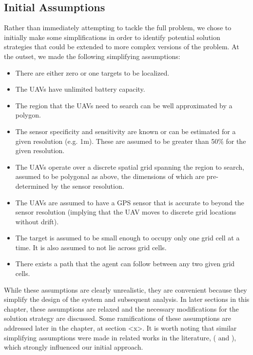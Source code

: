 \subsection{Initial Assumptions}\label{subsec:initalAssumptions}

Rather than immediately attempting to tackle the full problem, we chose to initially make some simplifications in order to identify potential solution strategies that could be extended to more complex versions of the problem. At the outset, we made the following simplifying assumptions:
\begin{itemize}
    \item There are either zero or one targets to be localized.
    \item The UAVs have unlimited battery capacity.
    \item The region that the UAVs need to search can be well approximated by a polygon.
    \item The sensor specificity and sensitivity are known or can be estimated for a given resolution (e.g. 1m). These are assumed to be greater than 50\% for the given resolution.
    \item The UAVs operate over a discrete spatial grid spanning the region to search, assumed to be polygonal as above, the dimensions of which are pre-determined by the sensor resolution.
    \item The UAVs are assumed to have a GPS sensor that is accurate to beyond the sensor resolution (implying that the UAV moves to discrete grid locations without drift).
    \item The target is assumed to be small enough to occupy only one grid cell at a time. It is also assumed to not lie across grid cells.
    \item There exists a path that the agent can follow between any two given grid cells.
\end{itemize}
While these assumptions are clearly unrealistic, they are convenient because they simplify the design of the system and subsequent analysis. In later sections in this chapter, these assumptions are relaxed and the necessary modifications for the solution strategy are discussed. Some ramifications of these assumptions are addressed later in the chapter, at section <x>. It is worth noting that similar simplifying assumptions were made in related works in the literature, 
(\cite{Chung2007ASearch} and \cite{Waharte2010SupportingUAVs}), %
which strongly influenced our initial approach.